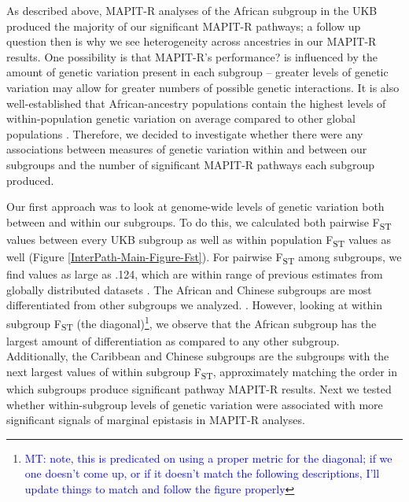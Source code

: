 \documentclass[12pt,a4paper]{article}
\begin{document}
As described above, MAPIT-R analyses of the African subgroup in the UKB produced the majority of our significant MAPIT-R pathways; a follow up question then is why we see heterogeneity across ancestries in our MAPIT-R results. One possibility is that MAPIT-R's performance? is influenced by the amount of genetic variation present in each subgroup -- greater levels of genetic variation may allow for greater numbers of possible genetic interactions. It is also well-established that African-ancestry populations contain the highest levels of within-population genetic variation on average compared to other global populations \citep{International2010,Genomes2015,Mallick2016}. Therefore, we decided to investigate whether there were any associations between measures of genetic variation within and between our subgroups and the number of significant MAPIT-R pathways each subgroup produced.

Our first approach was to look at genome-wide levels of genetic variation both between and within our subgroups. To do this, we calculated both pairwise F\textsubscript{ST} values between every UKB subgroup as well as within population F\textsubscript{ST} values as well (Figure \ref{InterPath-Main-Figure-Fst}). For pairwise F\textsubscript{ST} among subgroups, we find values as large as .124, which are within range of previous estimates from globally distributed datasets \citep{Ramachandran2005,Weir2005,Henn2011,Wang2012,Sugden2016}. The African and Chinese subgroups are most differentiated from other subgroups we analyzed. . However, looking at within subgroup F\textsubscript{ST} (the diagonal)\footnote{\textcolor{blue}{MT: note, this is predicated on using a proper metric for the diagonal; if we one doesn't come up, or if it doesn't match the following descriptions, I'll update things to match and follow the figure properly}}, we observe that the African subgroup has the largest amount of differentiation as compared to any other subgroup. Additionally, the Caribbean and Chinese subgroups are the subgroups with the next largest values of within subgroup F\textsubscript{ST}, approximately matching the order in which subgroups produce significant pathway MAPIT-R results. Next we tested whether within-subgroup levels of genetic variation were associated with more significant signals of marginal epistasis in MAPIT-R analyses.
\end{document}

